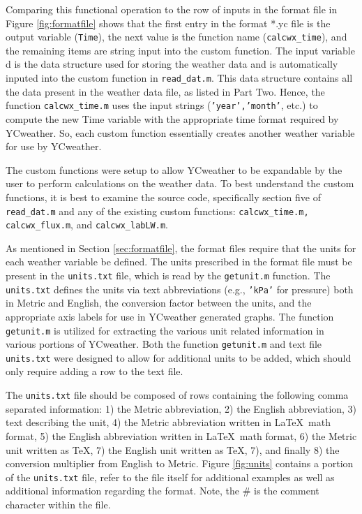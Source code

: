 Comparing this functional operation to the row of inputs in the format file in Figure \ref{fig:formatfile} shows that the first entry in the format *.yc file is the output variable (\texttt{Time}), the next value is the function name (\texttt{calcwx\_time}), and the remaining items are string input into the custom function.  The input variable d is the data structure used for storing the weather data and is automatically inputed into the custom function in \texttt{read\_dat.m}.  This data structure contains all the data present in the weather data file, as listed in Part Two.  Hence, the function \texttt{calcwx\_time.m} uses the input strings (\texttt{'year','month'}, etc.) to compute the new Time variable with the appropriate time format required by YCweather.  So, each custom function essentially creates another weather variable for use by YCweather.

The custom functions were setup to allow YCweather to be expandable by the user to perform calculations on the weather data.  To best understand the custom functions, it is best to examine the source code, specifically section five of \texttt{read\_dat.m} and any of the existing custom functions: \texttt{calcwx\_time.m, calcwx\_flux.m}, and \texttt{calcwx\_labLW.m}.

\label{sec:units}
As mentioned in Section \ref{sec:formatfile}, the format files require that the units for each weather variable be defined.  The units prescribed in the format file must be present in the \texttt{units.txt} file, which is read by the \texttt{getunit.m} function.  The \texttt{units.txt} defines the units via text abbreviations (e.g., \texttt{'kPa'} for pressure) both in Metric and English, the conversion factor between the units, and the appropriate axis labels for use in YCweather generated graphs. The function \texttt{getunit.m} is utilized for extracting the various unit related information in various portions of YCweather.  Both the function \texttt{getunit.m} and text file \texttt{units.txt} were designed to allow for additional units to be added, which should only require adding a row to the text file. 

The \texttt{units.txt} file should be composed of rows containing the following comma separated information: 1) the Metric abbreviation, 2) the English abbreviation, 3) text describing the unit, 4) the Metric abbreviation written in \LaTeX ~math format, 5) the English abbreviation written in \LaTeX ~math format, 6) the Metric unit written as \TeX, 7) the English unit written as \TeX, 7), and finally 8) the conversion multiplier from English to Metric.  Figure \ref{fig:units} contains a portion of the \texttt{units.txt} file, refer to the file itself for additional examples as well as additional information regarding the format.  Note, the \# is the comment character within the file.


